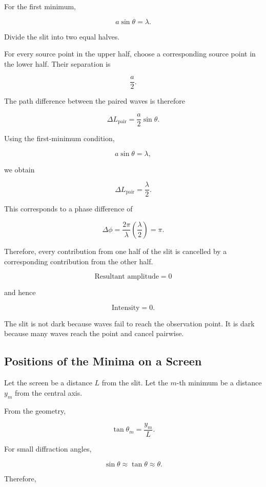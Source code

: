 \documentclass{studentnotes}
\begin{document}
For the first minimum,

\[
    a\sin\theta=\lambda.
\]

Divide the slit into two equal halves.

For every source point in the upper half, choose a corresponding source point in the lower half. Their separation is

\[
    \frac{a}{2}.
\]

The path difference between the paired waves is therefore

\[
    \Delta L_{\text{pair}}
    =
    \frac{a}{2}\sin\theta.
\]

Using the first-minimum condition,

\[
    a\sin\theta=\lambda,
\]

we obtain

\[
    \Delta L_{\text{pair}}
    =
    \frac{\lambda}{2}.
\]

This corresponds to a phase difference of

\[
    \Delta\phi
    =
    \frac{2\pi}{\lambda}
    \left(\frac{\lambda}{2}\right)
    =
    \pi.
\]

Therefore, every contribution from one half of the slit is cancelled by a corresponding contribution from the other half.

\[
    \boxed{\text{Resultant amplitude}=0}
\]

and hence

\[
    \boxed{\text{Intensity}=0.}
\]

\begin{personalnote}
    The slit is not dark because waves fail to reach the observation point. It is dark because many waves reach the point and cancel pairwise.
\end{personalnote}

\subsection{Positions of the Minima on a Screen}

Let the screen be a distance \(L\) from the slit. Let the \(m\)-th minimum be a distance \(y_m\) from the central axis.

From the geometry,

\[
    \tan\theta_m=\frac{y_m}{L}.
\]

For small diffraction angles,

\[
    \sin\theta\approx\tan\theta\approx\theta.
\]

Therefore,
\end{document}
